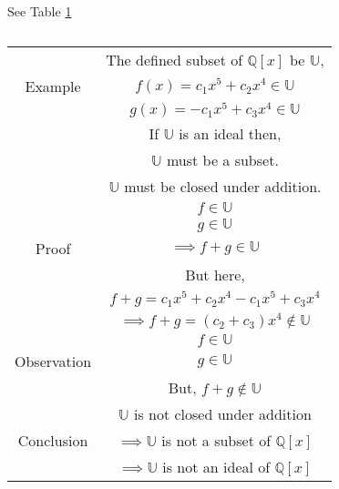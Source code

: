 See Table \ref{table:solutions/4/3/1/b/}

\begin{table}[h!]
\begin{center}

\begin{tabular}{|c|c|}
\hline
& The defined subset of $\mathbb{Q}[x]$ be $\mathbb{U}$,\\
Example & $f(x) = c_1x^5+c_2x^4 \in \mathbb{U}$\\
& $g(x) = -c_1x^5+c_3x^4 \in \mathbb{U}$\\
\hline
&  If $\mathbb{U}$ is an ideal then,\\
&  $\mathbb{U}$ must be a subset. \\
& $\mathbb{U}$ must be closed under addition.\\
&  $f \in \mathbb{U}$\\
&  $g \in \mathbb{U}$\\
Proof & $\implies f+g \in \mathbb{U}$\\
& But here, \\
& $f+g=c_1x^5+c_2x^4-c_1x^5+c_3x^4$\\
& $\implies f+g = (c_2+c_3)x^4 \notin \mathbb{U}$\\
\hline
& $f \in \mathbb{U}$\\
Observation & $g \in \mathbb{U}$\\
& But, $f+g \notin \mathbb{U}$\\
\hline
& $\mathbb{U}$ is not closed under addition\\
Conclusion & $\implies \mathbb{U}$ is not a subset of $\mathbb{Q}[x]$\\
& $\implies \mathbb{U}$ is not an ideal of $\mathbb{Q}[x]$\\
\hline
\end{tabular}
\end{center}
\caption{}
\label{table:solutions/4/3/1/b/}
\end{table}
